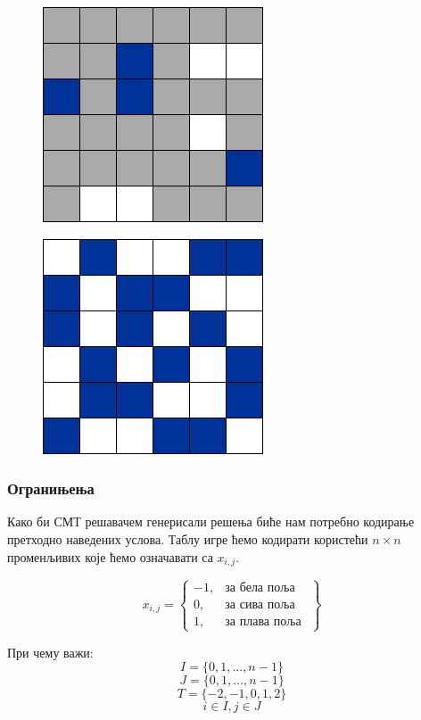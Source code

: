 \documentclass[a4paper]{article}
\begin{document}
\begin{figure}
\centering
\begin{minipage}{.5\textwidth}
    \centering
    \includegraphics[width=.4\linewidth]{./slike/three_way_original.png}
    \label{fig:threeway_original}
\end{minipage}%
\begin{minipage}{.5\textwidth}
  \centering
  \includegraphics[width=.4\linewidth]{./slike/three_way_solved.png}
  \label{fig:threeway_solved}
\end{minipage}
\end{figure}

\subsubsection{Огранињења}
Како би СМТ решавачем генерисали решења биће нам потребно кодирање претходно наведених услова. Таблу игре
ћемо кодирати користећи $n \times n$ променљивих које ћемо означавати са $x_{i, j}$.


\[
    x_{i, j} = \left\{\begin{array}{lr}
        -1, & \text{за бела поља} \\
        0, & \text{за сива поља } \\
        1, & \text{за плава поља }
    \end{array}\right\}
\]

При чему важи:
$$ I = \{0, 1, ..., n-1\} $$
$$ J = \{0, 1, ..., n-1\} $$
$$ T = \{-2, -1, 0, 1, 2\} $$
$$ i \in I, j \in J $$
\end{document}
